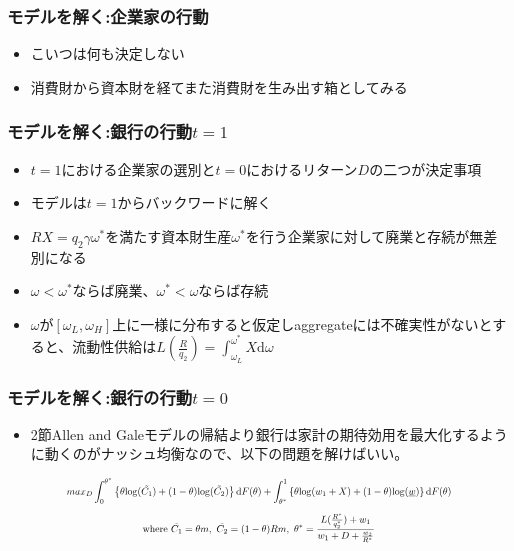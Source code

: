 \documentclass[dvipdfmx, 12pt]{beamer}
\begin{document}
\begin{frame}\frametitle{モデルを解く:企業家の行動}
	\begin{itemize}
		\item こいつは何も決定しない
		\item 消費財から資本財を経てまた消費財を生み出す箱としてみる
	\end{itemize}
\end{frame}

\begin{frame}\frametitle{モデルを解く:銀行の行動$t = 1$}
	\begin{itemize}
		\item $t = 1$における企業家の選別と$t = 0$におけるリターン$D$の二つが決定事項
		\item モデルは$t=1$からバックワードに解く
		\item $RX = q_2\gamma \omega^*$を満たす資本財生産$\omega^*$を行う企業家に対して廃業と存続が無差別になる
		\item $\omega < \omega^*$ならば廃業、$\omega^* < \omega$ならば存続
		\item $\omega$が$[\omega_L, \omega_H]$上に一様に分布すると仮定しaggregateには不確実性がないとすると、流動性供給は$L(\frac{R}{q_2}) = \int_{\omega_L}^{\omega^*}X\mathrm{d}\omega$
	\end{itemize}
\end{frame}

\begin{frame}\frametitle{モデルを解く:銀行の行動$t = 0$}
	\begin{itemize}
		\item 2節Allen and Galeモデルの帰結より銀行は家計の期待効用を最大化するように動くのがナッシュ均衡なので、以下の問題を解けばいい。
	\end{itemize}
	\begin{align*}
	\scalebox{0.7}{$\displaystyle
	max_{D} \int_0^{\theta^*}\left\{ \theta{\rm log}(\tilde{C_1})+(1-\theta){\rm log}(\tilde{C_2}) \right\}\mathrm{d}F(\theta) + \int_{\theta^*}^1 \left\{ \theta{\rm log}(w_1+X)+(1-\theta){\rm log}(\underline{w}) \right\}\mathrm{d}F(\theta)
	$}
	\end{align*}
	\begin{align*}
	\scalebox{0.7}{$\displaystyle
		\text{where}\ \tilde{C_1} = \theta m,\ \tilde{C_2} = (1-\theta)Rm,\ \theta^* = \frac{L(\frac{R^*}{q_2^*}) + w_1}{w_1 + D + \frac{w_2}{R^*}}
		$}
	\end{align*}
\end{frame}
\end{document}
